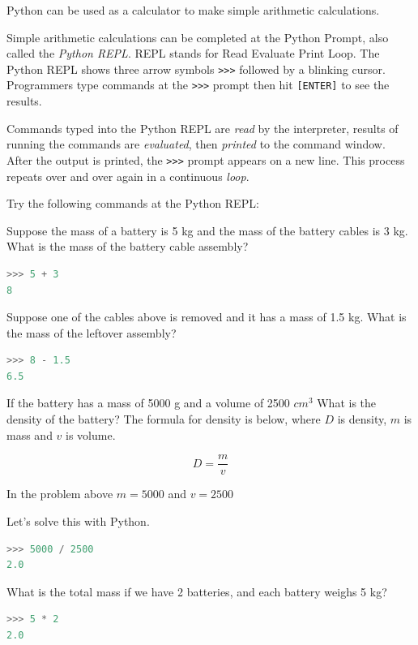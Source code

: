 \documentclass{book}
\begin{document}
Python can be used as a calculator to make simple arithmetic
calculations.

Simple arithmetic calculations can be completed at the Python Prompt,
also called the \emph{Python REPL}. REPL stands for Read Evaluate Print
Loop. The Python REPL shows three arrow symbols \lstinline!>>>! followed
by a blinking cursor. Programmers type commands at the \lstinline!>>>!
prompt then hit \lstinline![ENTER]! to see the results.

Commands typed into the Python REPL are \emph{read} by the interpreter,
results of running the commands are \emph{evaluated}, then
\emph{printed} to the command window. After the output is printed, the
\lstinline!>>>! prompt appears on a new line. This process repeats over
and over again in a continuous \emph{loop}.

Try the following commands at the Python REPL:

Suppose the mass of a battery is 5 kg and the mass of the battery cables
is 3 kg. What is the mass of the battery cable assembly?

\begin{lstlisting}[language=Python]
>>> 5 + 3
8
\end{lstlisting}

Suppose one of the cables above is removed and it has a mass of 1.5 kg.
What is the mass of the leftover assembly?

\begin{lstlisting}[language=Python]
>>> 8 - 1.5
6.5
\end{lstlisting}

If the battery has a mass of 5000 g and a volume of 2500 \(cm^3\) What
is the density of the battery? The formula for density is below, where
\(D\) is density, \(m\) is mass and \(v\) is volume.

\[ D = \frac{m}{v} \]

In the problem above \(m = 5000\) and \(v=2500\)

Let's solve this with Python.

\begin{lstlisting}[language=Python]
>>> 5000 / 2500
2.0
\end{lstlisting}

What is the total mass if we have 2 batteries, and each battery weighs 5
kg?

\begin{lstlisting}[language=Python]
>>> 5 * 2
2.0
\end{lstlisting}
\end{document}
